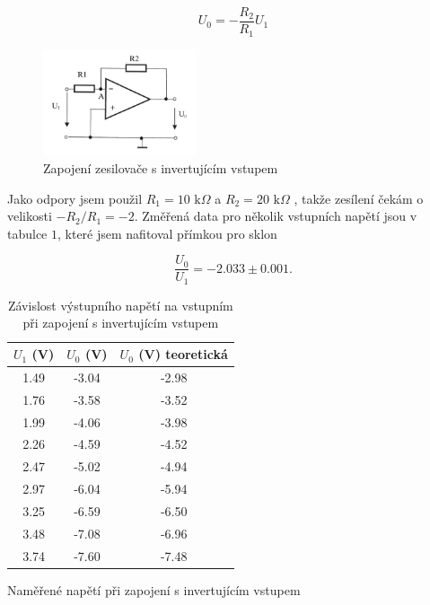 \documentclass[a4paper,11pt]{article}
\begin{document}
\begin{equation}
U_{0} = - \frac{R_2}{R_1} U_1
\end{equation}

\begin{figure}[htpb]
    \centering
    \includegraphics[width=0.4\textwidth]{invertujici_sch.jpg}
    \caption{Zapojení zesilovače s invertujícím vstupem}
\end{figure}

Jako odpory jsem použil $ R_1 = 10 \text{ k} \Omega $ a $ R_2 = 20 \text{ k} \Omega  $ , takže zesílení čekám o velikosti $ - R_2 / R_1 = -2 $. Změřená data pro několik vstupních napětí jsou v tabulce $ 1 $, které jsem nafitoval přímkou pro sklon 

\begin{equation}
\frac{U_0}{U_1} = -2.033 \pm 0.001.
\end{equation}

\begin{table}[h]
    \begin{minipage}{.45\linewidth}
    \vspace{-15pt}
    \centering
    \begin{tabular}{| c c c | }
        \hline
        $ U_1 $ (V) & $ U_0 $ (V) & $ U_0 $ (V)  teoretická \\ \hline
        1.49 & -3.04 & -2.98 \\
        1.76 & -3.58 & -3.52 \\
        1.99 & -4.06 & -3.98 \\
        2.26 & -4.59 & -4.52 \\
        2.47 & -5.02 & -4.94 \\
        2.97 & -6.04 & -5.94 \\
        3.25 & -6.59 & -6.50 \\
        3.48 & -7.08 & -6.96 \\
        3.74 & -7.60 & -7.48 \\
        \hline
    \end{tabular}
    \caption{Naměřené napětí při zapojení s invertujícím vstupem}
    \end{minipage} 
    \hfill
    \begin{minipage}{.5\linewidth}
        \centering
        \resizebox{\textwidth}{!}{  }
        \captionsetup{type=graph}
        \caption{Závislost výstupního napětí na vstupním při zapojení s invertujícím vstupem}
    \end{minipage} 
\end{table}
\end{document}
